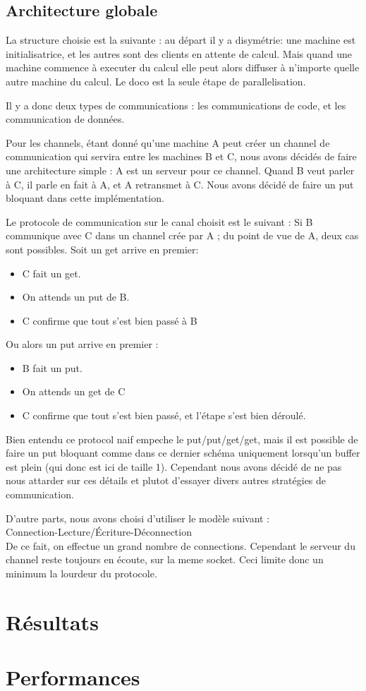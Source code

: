 \documentclass[a4paper]{article}
\begin{document}
\subsection{Architecture globale}
La structure choisie est la suivante : au départ il y a disymétrie: une
machine est initialisatrice, et les autres sont des clients en attente de
calcul. Mais quand une machine commence à executer du calcul elle peut
alors diffuser à n'importe quelle autre machine du calcul. Le doco est la seule étape de
parallelisation.

Il y a donc deux types de communications : les communications de code, et
les communication de données.


Pour les channels, étant donné qu'une machine A peut créer un channel de
communication qui servira entre les machines B et C, nous avons décidés
de faire une architecture simple : A est un serveur pour ce channel.
Quand B veut parler à C, il parle en fait à A, et A retransmet à C.
Nous avons décidé de faire un put bloquant dans cette implémentation.


Le protocole de communication sur le canal choisit est le suivant : 
Si B communique avec C dans un channel crée par A ; du point de vue de A, deux cas sont
possibles. Soit un get arrive en premier: 
\begin{itemize}
\item C fait un get.
\item On attends un put de B.
\item C confirme que tout s'est bien passé à B 
\end{itemize}

Ou alors un put arrive en premier :

\begin{itemize}
\item B fait un put.
\item On attends un get de C
\item C confirme que tout s'est bien passé, et l'étape s'est bien
déroulé.
\end{itemize}

Bien entendu ce protocol naif empeche le put/put/get/get, mais il est
possible de faire un put bloquant comme dans ce dernier schéma
uniquement lorsqu'un buffer est plein (qui donc est ici de taille 1). Cependant nous avons décidé de ne
pas nous attarder sur ces détails et plutot d'essayer divers autres
stratégies de communication.

D'autre parts, nous avons choisi d'utiliser le modèle suivant :\\
Connection-Lecture/Écriture-Déconnection \\
De ce fait, on effectue un grand nombre de connections. Cependant le
serveur du channel reste toujours en écoute, sur la meme socket. Ceci
limite donc un minimum la lourdeur du protocole.


 

\section{Résultats}

\section{Performances}
\end{document}
